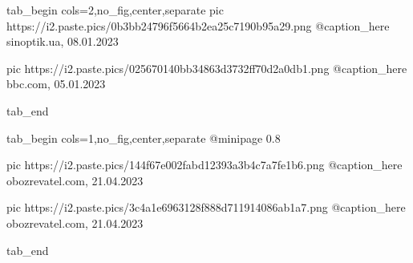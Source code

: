  
 
 
 
 

\ifcmt
  tab_begin cols=2,no_fig,center,separate
     pic https://i2.paste.pics/0b3bb24796f5664b2ea25c7190b95a29.png
     @caption_here sinoptik.ua, 08.01.2023 

     pic https://i2.paste.pics/025670140bb34863d3732ff70d2a0db1.png
     @caption_here bbc.com, 05.01.2023

  tab_end
\fi

\ifcmt
  tab_begin cols=1,no_fig,center,separate
     @minipage 0.8

     pic https://i2.paste.pics/144f67e002fabd12393a3b4c7a7fe1b6.png
     @caption_here obozrevatel.com, 21.04.2023

     pic https://i2.paste.pics/3c4a1e6963128f888d711914086ab1a7.png
     @caption_here obozrevatel.com, 21.04.2023

  tab_end
\fi

